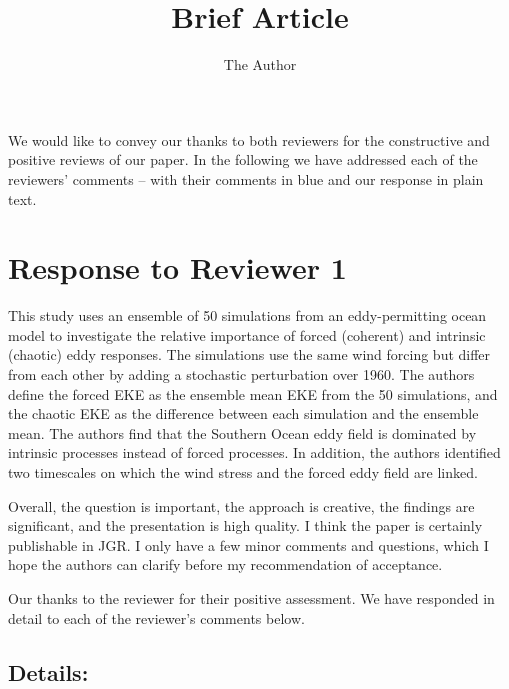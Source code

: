 \documentclass[11pt]{article}
\title{Brief Article}
\author{The Author}
\begin{document}


\noindent We would like to convey our thanks to both reviewers for the constructive and positive reviews of our paper. 
In the following we have addressed each of the reviewers' comments -- with their comments in blue and our response in plain text.

\section*{Response to Reviewer 1}

{\color{blue} This study uses an ensemble of 50 simulations from an eddy-permitting ocean model to investigate the relative importance of forced (coherent) and intrinsic (chaotic) eddy responses. The simulations use the same wind forcing but differ from each other by adding a stochastic perturbation over 1960. The authors define the forced EKE as the ensemble mean EKE from the 50 simulations, and the chaotic EKE as the difference between each simulation and the ensemble mean. The authors find that the Southern Ocean eddy field is dominated by intrinsic processes instead of forced processes. In addition, the authors identified two timescales on which the wind stress and the forced eddy field are linked. 

Overall, the question is important, the approach is creative, the findings are significant, and the presentation is high quality. I think the paper is certainly publishable in JGR. I only have a few minor comments and questions, which I hope the authors can clarify before my recommendation of acceptance.\\}

\noindent Our thanks to the reviewer for their positive assessment. 
We have responded in detail to each of the reviewer's comments below.

\subsection*{\color{blue}Details:}
\end{document}
